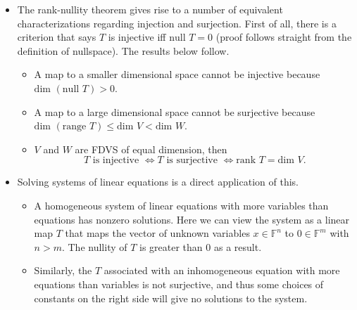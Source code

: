 \documentclass{article}
\newcommand{\F}{\mathbb{F}}
\newcommand{\n}{\text{null }}
\renewcommand{\r}{\text{range }}
\renewcommand{\d}{\text{dim }}
\begin{document}
\begin{itemize}
\begin{itemize}
    \end{itemize}
    \item The rank-nullity theorem gives rise to a number of equivalent characterizations regarding injection and surjection. First of all, there is a criterion that says $T$ is injective iff $\n T = {0}$ (proof follows straight from the definition of nullspace). The results below follow.
    \begin{itemize}
        \item A map to a smaller dimensional space cannot be injective because $\d (\n T) > 0$.
        \item A map to a large dimensional space cannot be surjective because $\d (\r T) \leq \d V < \d W$.
        \item $V$ and $W$ are FDVS of equal dimension, then $$T \text{ is injective } \Longleftrightarrow T \text{ is surjective } \Longleftrightarrow \text{rank } T = \d V.$$
    \end{itemize}
    \item Solving systems of linear equations is a direct application of this.
    \begin{itemize}
        \item A homogeneous system of linear equations with more variables than equations has nonzero solutions. Here we can view the system as a linear map $T$ that maps the vector of unknown variables $x \in \F^n$ to $0 \in \F^m$ with $n > m$. The nullity of $T$ is greater than 0 as a result.
        \item Similarly, the $T$ associated with an inhomogeneous equation with more equations than variables is not surjective, and thus some choices of constants on the right side will give no solutions to the system.
    \end{itemize}
\end{itemize}
\end{document}
